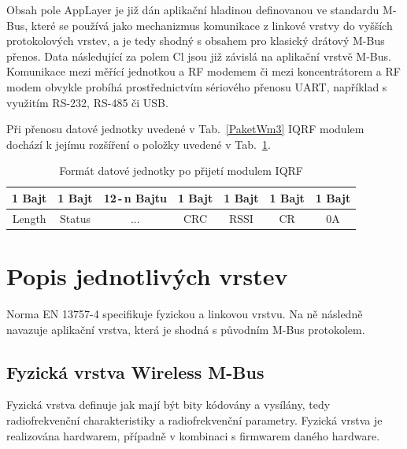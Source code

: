 Obsah pole AppLayer je již dán aplikační hladinou definovanou ve standardu M-Bus, které se používá jako mechanizmus komunikace z linkové vrstvy do vyšších protokolových vrstev, a je tedy shodný s obsahem pro klasický drátový M-Bus přenos.  Data následující za polem Cl jsou již závislá na aplikační vrstvě M-Bus. Komunikace mezi měřící jednotkou a RF modemem či mezi koncentrátorem a RF modem obvykle probíhá prostřednictvím sériového přenosu UART, například s využitím RS-232, RS-485 či USB.

Při přenosu datové jednotky uvedené v Tab.~\ref{PaketWm3} IQRF modulem dochází k jejímu rozšíření o položky uvedené v Tab.~\ref{PaketWm4}.

\begin{table}[!h]
\centering
\begin{tabular}{ccccccc}
1 Bajt & 1 Bajt & 12\,-\,n Bajtu & 1 Bajt & 1 Bajt & 1 Bajt & 1 Bajt\\ \hline
\multicolumn{1}{|c|}{Length} & \multicolumn{1}{c|}{Status} & \multicolumn{1}{c|}{...} & \multicolumn{1}{c|}{CRC} & \multicolumn{1}{c|}{RSSI} & \multicolumn{1}{c|}{CR} & \multicolumn{1}{c|}{0A}\\ \hline
\end{tabular}
\caption{Formát datové jednotky po přijetí modulem IQRF}
\label{PaketWm4}
\end{table}






\section{Popis jednotlivých vrstev}

Norma EN 13757-4 specifikuje fyzickou a linkovou vrstvu. Na ně následně navazuje aplikační vrstva, která je shodná s původním M-Bus protokolem.

\subsection{Fyzická vrstva Wireless M-Bus}
Fyzická vrstva definuje jak mají být bity kódovány a vysílány, tedy radiofrekvenční charakteristiky a radiofrekvenční parametry. Fyzická vrstva je realizována hardwarem, případně v kombinaci s firmwarem daného hardware.

